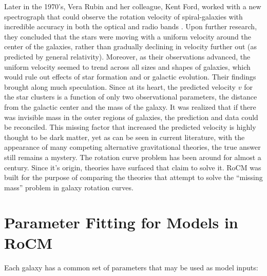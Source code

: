 \documentclass[conference]{IEEEtran-modified}
\begin{document}
Later in the 1970's, Vera Rubin and her colleague, Kent Ford, worked with a new spectrograph that could observe the rotation velocity of spiral-galaxies with incredible accuracy in both the optical and radio bands \cite{rubin1980}. Upon further research, they concluded that the stars were moving with a uniform velocity around the center of the galaxies, rather than gradually declining in velocity further out (as predicted by general relativity).  Moreover, as their observations advanced, the uniform velocity seemed to trend across all sizes and shapes of galaxies, which would rule out effects of star formation and or galactic evolution. Their findings brought along much speculation.  Since at its heart, the predicted velocity $v$ for the star clusters is a function of only two observational parameters, the distance from the galactic center and the mass of the galaxy. It was realized that if there was invisible mass in the outer regions of galaxies, the prediction and data could be reconciled. This missing factor that increased the predicted velocity is highly thought to be dark matter, yet as can be seen in current literature, with the appearance of many competing alternative gravitational theories, the true answer still remains a mystery.
The rotation curve problem has been around for almost a century. Since it's origin, theories have surfaced that claim to solve it. RoCM was built for the purpose of comparing the theories that attempt to solve the ``missing mass'' problem in galaxy rotation curves.


\section{Parameter Fitting for Models in RoCM}
Each galaxy has a common set of parameters that may be used as model inputs: 
\begin{table}[h]
	\centering
	\normalsize
\end{table}
\end{document}
